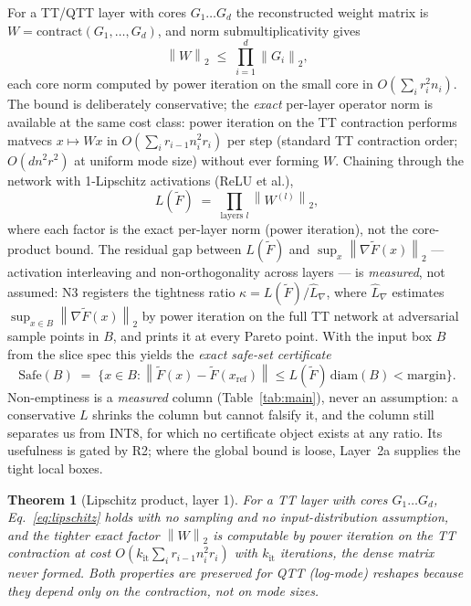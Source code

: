 \documentclass[conference,10pt]{IEEEtran}
\newtheorem{theorem}{Theorem}
\newcommand{\F}{\widetilde{F}}
\newcommand{\norm}[1]{\left\lVert #1 \right\rVert}
\begin{document}
For a TT/QTT layer with cores $G_1\dots G_d$ the reconstructed weight matrix
is $W = \mathrm{contract}(G_1,\dots,G_d)$, and norm submultiplicativity gives
\begin{equation}
\norm{W}_2 \;\le\; \prod_{i=1}^{d} \norm{G_i}_2 ,
\label{eq:lipschitz}
\end{equation}
each core norm computed by power iteration on the small core in
$O(\sum_i r_i^2 n_i)$. The bound is deliberately conservative; the
\emph{exact} per-layer operator norm is available at the same cost class:
power iteration on the TT contraction performs matvecs $x \mapsto Wx$ in
$O(\sum_i r_{i-1} n_i^2 r_i)$ per step (standard TT contraction order;
$O(d n^2 r^2)$ at uniform mode size) without ever forming $W$. Chaining through the
network with 1-Lipschitz activations (ReLU et al.),
\begin{equation}
L(\F) \;=\; \prod_{\text{layers }l} \norm{W^{(l)}}_2 ,
\end{equation}
where each factor is the exact per-layer norm (power iteration), not the
core-product bound. The residual gap between $L(\F)$ and
$\sup_x \norm{\nabla \F(x)}_2$ --- activation interleaving and non-orthogonality
across layers --- is \emph{measured}, not assumed: N3 registers the tightness
ratio $\kappa = L(\F)/\widehat{L}_\nabla$, where $\widehat{L}_\nabla$ estimates
$\sup_{x\in B}\norm{\nabla \F(x)}_2$ by power iteration on the full TT network
at adversarial sample points in $B$, and prints it at every Pareto point.
With the input box $B$ from the slice spec this yields the \emph{exact
safe-set certificate}
\begin{equation}
\mathrm{Safe}(B) \;=\; \big\{ x \in B : \norm{\F(x)-\F(x_{\mathrm{ref}})} \le
L(\F)\,\mathrm{diam}(B) < \mathrm{margin} \big\}.
\label{eq:safeset}
\end{equation}
Non-emptiness is a \emph{measured} column (Table~\ref{tab:main}), never an
assumption: a conservative $L$ shrinks the column but cannot falsify it, and
the column still separates us from INT8, for which no certificate object
exists at any ratio. Its usefulness is gated by R2; where the global bound is
loose, Layer~2a supplies the tight local boxes.

\begin{theorem}[Lipschitz product, layer 1]
For a TT layer with cores $G_1\dots G_d$, Eq.~\eqref{eq:lipschitz} holds with
no sampling and no input-distribution assumption, and the tighter exact factor
$\norm{W}_2$ is computable by power iteration on the TT contraction at cost
$O(k_{\mathrm{it}}\sum_i r_{i-1} n_i^2 r_i)$ with $k_{\mathrm{it}}$ iterations,
the dense matrix never formed. Both properties are preserved for QTT (log-mode)
reshapes because they depend only on the contraction, not on mode sizes.
\end{theorem}
\end{document}
